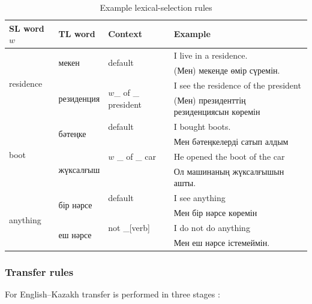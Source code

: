 \documentclass[11pt]{article}
\begin{document}
\begin{table}
 \centering
 \begin{tabular}{|l|l|l|l|}
    \hline
    \textbf{SL word \(w\)} & \textbf{TL word} & \textbf{Context} & \textbf{Example} \\
    \hline
    \multirow{4}{*}{residence} & \multirow{2}{*}{мекен}      & \multirow{2}{*}{default} & I live in a residence. \\
                               &                             &                     & (Мен) мекенде өмір сүремін. \\
                               & \multirow{2}{*}{резиденция} & \multirow{2}{*}{\(w\)\_ of \_ president} & I see the residence of the president \\ 
                               &                             &                                     & (Мен) президенттің резиденциясын көремін \\
    \hline
    \multirow{4}{*}{boot} & \multirow{2}{*}{бәтеңке} & default & I bought boots. \\
                          &                          &     &  Мен бәтеңкелерді сатып алдым \\

                          & \multirow{2}{*}{жүксалғыш} & \(w\) \_ of \_ car &  He opened the boot of the car  \\ 
                          &           &              & Ол машинаның жүксалғышын ашты. \\
    \hline
    \multirow{4}{*}{anything} & \multirow{2}{*}{бір нәрсе} & default & I see anything  
\\ 
                              &           &    & Мен бір нәрсе көремін \\
                              & \multirow{2}{*}{еш нәрсе} & not \_[verb] & I do not do anything \\ 
                              &          &             &  Мен еш нәрсе істемеймін. \\

    \hline
 \end{tabular}
  \caption{Example lexical-selection rules}
  \label{table:lexsel}
\end{table}

\subsubsection{Transfer rules}

For English--Kazakh transfer is performed in three stages \citep{sundetova13b}:
\end{document}
